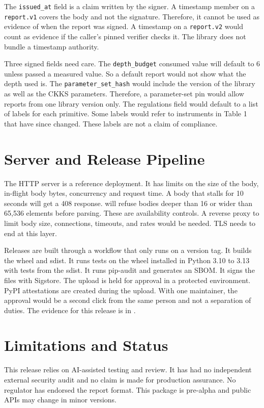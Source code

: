 \documentclass[10pt,a4paper]{article}
\begin{document}
The \texttt{issued\_at} field is a claim written by the signer. A timestamp member on a \texttt{report.v1} covers the body and not the signature. Therefore, it cannot be used as evidence of when the report was signed. A timestamp on a \texttt{report.v2} would count as evidence if the caller's pinned verifier checks it. The library does not bundle a timestamp authority.

Three signed fields need care. The \texttt{depth\_budget} consumed value will default to 6 unless passed a measured value. So a default report would not show what the depth used is. The \texttt{parameter\_set\_hash} would include the version of the library as well as the CKKS parameters. Therefore, a parameter-set pin would allow reports from one library version only. The regulations field would default to a list of labels for each primitive. Some labels would refer to instruments in Table 1 that have since changed. These labels are not a claim of compliance.

\section{Server and Release Pipeline}

The HTTP server is a reference deployment. It has limits on the size of the body, in-flight body bytes, concurrency and request time. A body that stalls for 10 seconds will get a 408 response.  will refuse bodies deeper than 16 or wider than 65,536 elements before parsing. These are availability controls. A reverse proxy to limit body size, connections, timeouts, and rates would be needed. TLS needs to end at this layer.

Releases are built through a workflow that only runs on a version tag. It builds the wheel and sdist. It runs tests on the wheel installed in Python 3.10 to 3.13 with tests from the sdist. It runs pip-audit and generates an SBOM. It signs the files with Sigstore. The upload is held for approval in a protected environment. PyPI attestations are created during the upload. With one maintainer, the approval would be a second click from the same person and not a separation of duties. The evidence for this release is in .

\section{Limitations and Status}

This release relies on AI-assisted testing and review. It has had no independent external security audit and no claim is made for production assurance. No regulator has endorsed the report format. This package is pre-alpha and public APIs may change in minor versions.
\end{document}
